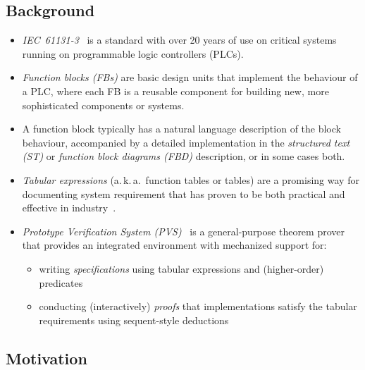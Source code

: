 \documentclass[a0,landscape]{a0poster}
\newcommand{\highlight}[1]{{\color{Fuchsia} \textit{#1}}}
\begin{document}
\begin{multicols}{4}
{\color{Blue} \subsection*{Background}}

\begin{itemize}
	
\item \highlight{IEC~61131-3}~\cite{IEC:2003:IEP} is a standard with over 20 years of use on critical systems running on programmable logic controllers (PLCs). 	
\item \highlight{Function blocks (FBs)} are basic design units that implement the behaviour of a  PLC, where each FB is a reusable component for building new, more sophisticated components or systems. 
\item A function block typically has a natural language description of the block behaviour, accompanied by a detailed implementation in the \highlight{structured text (ST)} or \highlight{function block diagrams (FBD)} description, or in some cases both.

\item \highlight{Tabular expressions} (a.\,k.\,a.\ function tables or tables) are a promising way for documenting system requirement that has proven to be both practical and effective in industry~\cite{Wassyng2003}.
\item \highlight{Prototype Verification System (PVS)}~\cite{Owre1992} is a general-purpose theorem prover that provides an integrated environment with mechanized support for: 
\begin{itemize}
\item writing \highlight{specifications} using tabular expressions and (higher-order) predicates 
\item conducting (interactively) \highlight{proofs} that implementations satisfy the tabular requirements using sequent-style deductions
\end{itemize}
\end{itemize}


{\color{Blue} \subsection*{Motivation}}


\end{multicols}
\end{document}
